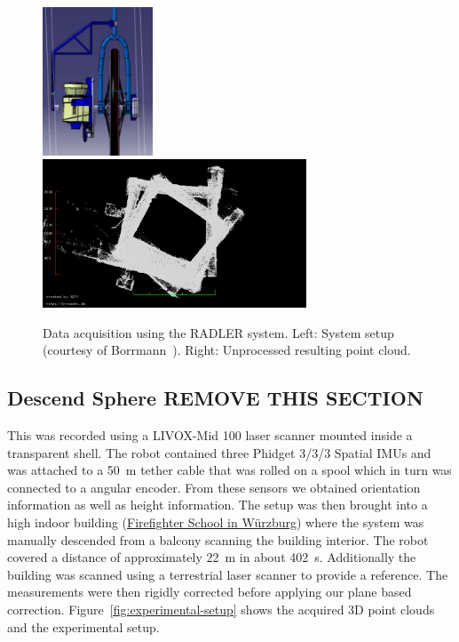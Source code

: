 \begin{figure}
	\centering
	\begin{minipage}[c]{\textwidth}
		\includegraphics[width=0.2925\textwidth]{./images/radler_setup}\hfill
		\includegraphics[width=0.7\textwidth]{./images/mathe_top_view}
	\end{minipage}
	\caption{Data acquisition using the RADLER system. Left: System setup (courtesy of Borrmann~\cite{Borrmann2020-RADLER}). Right: Unprocessed resulting point cloud.}
	\label{fig:radler-mathe}
\end{figure}

\subsection{Descend Sphere REMOVE THIS SECTION}

This was recorded using a LIVOX-Mid 100 laser scanner mounted inside a transparent shell. 
The robot contained three Phidget 3/3/3 Spatial IMUs and was attached to a \SI{50}{\meter} tether cable that was rolled on a spool which in turn was connected to a angular encoder. 
From these sensors we obtained orientation information as well as height information. 
The setup was then brought into a high indoor building (\href{https://www.sfs-w.de/feuerwehrschule/virtueller-rundgang.html}{Firefighter School in Würzburg}) where the system was manually descended from a balcony scanning the building interior.
The robot covered a distance of approximately \SI{22}{\meter} in about \SI{402}{\second}.
Additionally the building was scanned using a terrestrial laser scanner to provide a reference.
The measurements were then rigidly corrected before applying our plane based correction. 
Figure~\ref{fig:experimental-setup} shows the acquired 3D point clouds and the experimental setup. 

